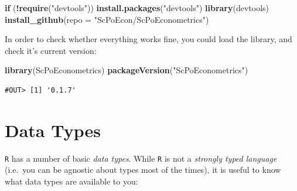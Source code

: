 \documentclass[]{book}
\newenvironment{Shaded}{\begin{snugshade}}{\end{snugshade}}
\newcommand{\KeywordTok}[1]{\textcolor[rgb]{0.13,0.29,0.53}{\textbf{#1}}}
\newcommand{\DataTypeTok}[1]{\textcolor[rgb]{0.13,0.29,0.53}{#1}}
\newcommand{\StringTok}[1]{\textcolor[rgb]{0.31,0.60,0.02}{#1}}
\newcommand{\ControlFlowTok}[1]{\textcolor[rgb]{0.13,0.29,0.53}{\textbf{#1}}}
\newcommand{\OperatorTok}[1]{\textcolor[rgb]{0.81,0.36,0.00}{\textbf{#1}}}
\newcommand{\NormalTok}[1]{#1}
\theoremstyle{definition}
\theoremstyle{definition}
\theoremstyle{definition}
\theoremstyle{remark}
\begin{document}
\begin{Shaded}
\begin{Highlighting}[]
\ControlFlowTok{if}\NormalTok{ (}\OperatorTok{!}\KeywordTok{require}\NormalTok{(}\StringTok{"devtools"}\NormalTok{)) }\KeywordTok{install.packages}\NormalTok{(}\StringTok{"devtools"}\NormalTok{)}
\KeywordTok{library}\NormalTok{(devtools)}
\KeywordTok{install_github}\NormalTok{(}\DataTypeTok{repo =} \StringTok{"ScPoEcon/ScPoEconometrics"}\NormalTok{)}
\end{Highlighting}
\end{Shaded}

In order to check whether everything works fine, you could load the
library, and check it's current version:

\begin{Shaded}
\begin{Highlighting}[]
\KeywordTok{library}\NormalTok{(ScPoEconometrics)}
\KeywordTok{packageVersion}\NormalTok{(}\StringTok{"ScPoEconometrics"}\NormalTok{)}
\end{Highlighting}
\end{Shaded}

\begin{verbatim}
#OUT> [1] '0.1.7'
\end{verbatim}

\section{Data Types}\label{data-types}

\texttt{R} has a number of basic \emph{data types}. While \texttt{R} is
not a \emph{strongly typed language} (i.e.~you can be agnostic about
types most of the times), it is useful to know what data types are
available to you:
\end{document}
